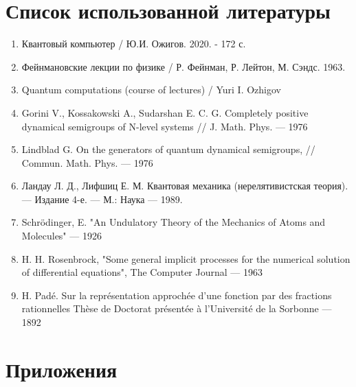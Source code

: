 \documentclass[12pt, a4paper]{article}
\begin{document}
\section{Список использованной литературы}
\begin{enumerate}
\item Квантовый компьютер / Ю.И. Ожигов. 2020. - 172 с.
\item Фейнмановские лекции по физике / Р. Фейнман, Р. Лейтон, М. Сэндс. 1963.
\item Quantum computations (course of lectures) / Yuri I. Ozhigov
\item Gorini V., Kossakowski A., Sudarshan E. C. G. Completely positive dynamical semigroups of N-level systems // J. Math. Phys. — 1976
\item  Lindblad G. On the generators of quantum dynamical semigroups, // Commun. Math. Phys. — 1976
\item Ландау Л. Д., Лифшиц Е. М. Квантовая механика (нерелятивистская теория). — Издание 4-е. — М.: Наука — 1989.
\item Schrödinger, E. "An Undulatory Theory of the Mechanics of Atoms and Molecules" — 1926
\item H. H. Rosenbrock, "Some general implicit processes for the numerical solution of differential equations", The Computer Journal — 1963 
\item H. Padé. Sur la représentation approchée d’une fonction par des fractions rationnelles Thèse de Doctorat présentée à l’Université de la Sorbonne — 1892

\end{enumerate}
\section{Приложения}
\end{document}
